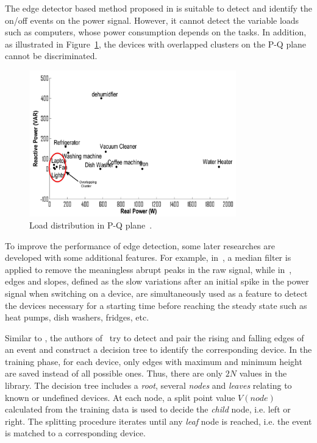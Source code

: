 The edge detector based method proposed in \cite{Hart92} is suitable to detect and identify the on/off events on the power signal. However, it cannot detect the variable loads such as computers, whose power consumption depends on the tasks. In addition, as illustrated in Figure~\ref{fig:A6}, the devices with overlapped clusters on the P-Q plane cannot be discriminated.

\begin{figure}
\centering
\includegraphics[width=0.8\textwidth]{./chapters/chapter2/images/overlap_PQplane.pdf} 
\caption{Load distribution in P-Q plane~\cite{Hazas11}.} 
\label{fig:A6} 
\end{figure}

To improve the performance of edge detection, some later researches are developed with some additional features. For example, in~\cite{Norford96,Marceau2000ECM}, a median filter is applied to remove the meaningless abrupt peaks in the raw signal, while in~\cite{Cole98IMTC}, edges and slopes, defined as the slow variations after an initial spike in the power signal when switching on a device, are simultaneously used as a feature to detect the devices necessary for a starting time before reaching the steady state such as heat pumps, dish washers, fridges, etc.

Similar to \cite{Hart92}, the authors of~\cite{Liao14} try to detect and pair the rising and falling edges of an event and construct a decision tree to identify the corresponding device. In the training phase, for each device, only edges with maximum and minimum height are saved instead of all possible ones. Thus, there are only $2N$ values in the library. 
The decision tree includes a\textit{ root}, several \textit{nodes} and \textit{leaves} relating to known or undefined devices. At each node, a split point value $V(node)$ calculated from the training data is used to decide the \textit{child} node, i.e. left or right. The splitting procedure iterates until any \textit{leaf} node is reached, i.e. the event is matched to a corresponding device.


